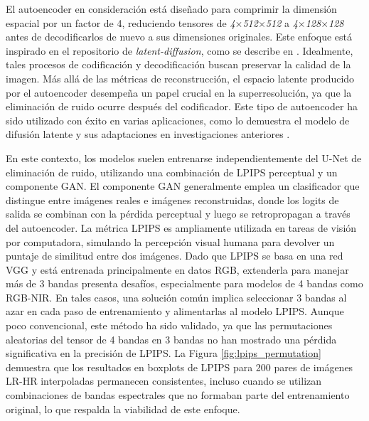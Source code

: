 El autoencoder en consideración está diseñado para comprimir la dimensión espacial por un factor de 4, reduciendo tensores de \textit{4$\times$512$\times$512} a \textit{4$\times$128$\times$128} antes de decodificarlos de nuevo a sus dimensiones originales. Este enfoque está inspirado en el repositorio de \textit{latent-diffusion}, como se describe en \autocite{rombach2022highresolution}. Idealmente, tales procesos de codificación y decodificación buscan preservar la calidad de la imagen. Más allá de las métricas de reconstrucción, el espacio latente producido por el autoencoder desempeña un papel crucial en la superresolución, ya que la eliminación de ruido ocurre después del codificador. Este tipo de autoencoder ha sido utilizado con éxito en varias aplicaciones, como lo demuestra el modelo de difusión latente y sus adaptaciones en investigaciones anteriores \autocite{esser2021taming}.

En este contexto, los modelos suelen entrenarse independientemente del U-Net de eliminación de ruido, utilizando una combinación de LPIPS perceptual y un componente GAN. El componente GAN generalmente emplea un clasificador que distingue entre imágenes reales e imágenes reconstruidas, donde los logits de salida se combinan con la pérdida perceptual y luego se retropropagan a través del autoencoder. La métrica LPIPS \autocite{zhang2018unreasonable} es ampliamente utilizada en tareas de visión por computadora, simulando la percepción visual humana para devolver un puntaje de similitud entre dos imágenes. Dado que LPIPS se basa en una red VGG \autocite{simonyan2015deep} y está entrenada principalmente en datos RGB, extenderla para manejar más de 3 bandas presenta desafíos, especialmente para modelos de 4 bandas como RGB-NIR. En tales casos, una solución común implica seleccionar 3 bandas al azar en cada paso de entrenamiento y alimentarlas al modelo LPIPS. Aunque poco convencional, este método ha sido validado, ya que las permutaciones aleatorias del tensor de 4 bandas en 3 bandas no han mostrado una pérdida significativa en la precisión de LPIPS. La Figura \ref{fig:lpips_permutation} demuestra que los resultados en boxplots de LPIPS para 200 pares de imágenes LR-HR interpoladas permanecen consistentes, incluso cuando se utilizan combinaciones de bandas espectrales que no formaban parte del entrenamiento original, lo que respalda la viabilidad de este enfoque.

